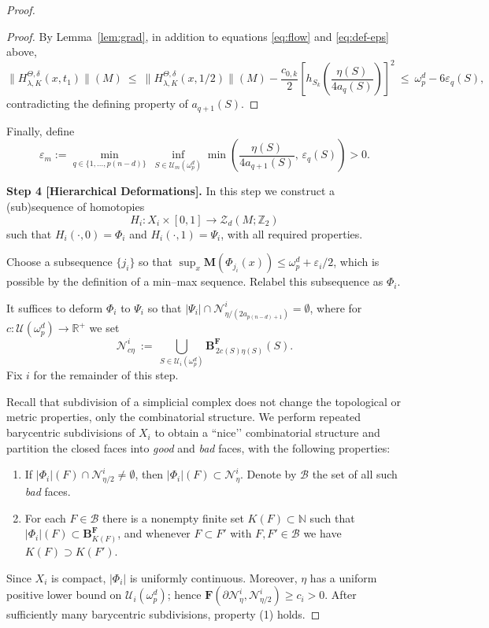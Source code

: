 \documentclass[12pt,english]{article}
\theoremstyle{definition}
\begin{document}
\begin{proof}
\begin{proof}
By Lemma~\ref{lem:grad}, in addition to equations \eqref{eq:flow} and \eqref{eq:def-eps} above,
\[
\|H^{\Theta,\delta}_{\lambda,K}(x,t_1)\|(M)
\ \le\ \|H^{\Theta,\delta}_{\lambda,K}(x,1/2)\|(M)-\frac{c_{0,k}}{2}\left[h_{S_k}\!\left(\frac{\eta(S)}{4a_q(S)}\right)\right]^2
\ \le\ \omega^d_p-6\varepsilon_q(S),
\]
contradicting the defining property of $a_{q+1}(S)$.
\end{proof}

Finally, define
\[
\varepsilon_m:=\min_{q\in\{1,\dots,p(n-d)\}}\ \inf_{S\in\mathcal{U}_m(\omega^d_p)}
\min\!\left(\frac{\eta(S)}{4a_{q+1}(S)},\,\varepsilon_q(S)\right)>0.
\]

\textbf{Step 4 [Hierarchical Deformations].}
In this step we construct a (sub)sequence of homotopies
\[
H_i: X_i \times [0,1] \longrightarrow \mathcal Z_d(M; \mathbb Z_2)
\]
such that \(H_i(\cdot,0)=\Phi_i\) and \(H_i(\cdot,1)=\Psi_i\), with all required properties.

Choose a subsequence \(\{j_i\}\) so that \(\sup_x \mathbf M(\Phi_{j_i}(x)) \le \omega^d_p + \varepsilon_i/2\), which is possible by the definition of a min--max sequence. Relabel this subsequence as \(\Phi_i\).

It suffices to deform \(\Phi_i\) to \(\Psi_i\) so that
\(|\Psi_i|\cap \mathcal N^i_{\eta/(2a_{p(n-d)+1})}=\emptyset\), where for
\(c:\mathcal U(\omega^d_p)\to\mathbb R^+\) we set
\[
\mathcal N^i_{c\eta}\ :=\ \bigcup_{S\in\mathcal U_i(\omega^d_p)} \mathbf B^{\mathbf F}_{\,2c(S)\eta(S)}(S).
\]
Fix \(i\) for the remainder of this step.

Recall that subdivision of a simplicial complex does not change the topological or metric properties, only the combinatorial structure. We perform repeated barycentric subdivisions of \(X_i\) to obtain a “nice’’ combinatorial structure and partition the closed faces into \textit{good} and \textit{bad} faces, with the following properties:
\begin{enumerate}
  \item If \(|\Phi_i|(F)\cap \mathcal N^i_{\eta/2}\neq\emptyset\), then \(|\Phi_i|(F)\subset \mathcal N^i_\eta\). Denote by \(\mathcal B\) the set of all such \textit{bad} faces.
  \item For each \(F\in\mathcal B\) there is a nonempty finite set \(K(F)\subset\mathbb N\) such that \(|\Phi_i|(F)\subset \mathbf B^{\mathbf F}_{K(F)}\), and whenever \(F\subset F'\) with \(F,F'\in\mathcal B\) we have \(K(F)\supset K(F')\).
\end{enumerate}
Since \(X_i\) is compact, \(|\Phi_i|\) is uniformly continuous. Moreover, \(\eta\) has a uniform positive lower bound on \(\mathcal U_i(\omega^d_p)\); hence \(\mathbf F(\partial\mathcal N^i_\eta,\mathcal N^i_{\eta/2})\ge c_i>0\). After sufficiently many barycentric subdivisions, property (1) holds.


\end{proof}
\end{document}
